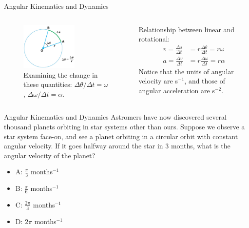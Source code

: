 \documentclass{beamer}
\begin{document}
\begin{frame}{Angular Kinematics and Dynamics}
\begin{columns}[T]
\begin{column}{0.5\textwidth}
\begin{figure}
\includegraphics[width=0.6\textwidth]{figures/circle1.png}
\caption{\label{fig:circle2} \small Examining the change in these quantities: $\Delta\theta/\Delta t = \omega$, $\Delta\omega/\Delta t = \alpha$.}
\end{figure}
\end{column}
\begin{column}{0.5\textwidth}
\centering
Relationship between linear and rotational:
\begin{align}
v = \frac{\Delta s}{\Delta t} &= r \frac{\Delta\theta}{\Delta t} = r\omega \\
a = \frac{\Delta v}{\Delta t} &= r \frac{\Delta\omega}{\Delta t} = r\alpha
\end{align}
Notice that the units of angular velocity are s$^{-1}$, and those of angular acceleration are s$^{-2}$.
\end{column}
\end{columns}
\end{frame}

\begin{frame}{Angular Kinematics and Dynamics}
Astromers have now discovered several thousand planets orbiting in star systems other than ours.  Suppose we observe a star system face-on, and see a planet orbiting in a circular orbit with constant angular velocity.  If it goes halfway around the star in 3 months, what is the angular velocity of the planet?
\begin{itemize}
\item A: $\frac{\pi}{3}$ months$^{-1}$
\item B: $\frac{\pi}{6}$ months$^{-1}$
\item C: $\frac{2\pi}{3}$ months$^{-1}$
\item D: $2\pi$ months$^{-1}$
\end{itemize}
\end{frame}
\end{document}
